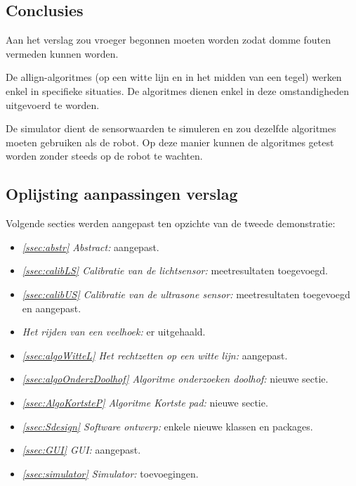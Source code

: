 \documentclass[tt3]{penoverslag}
\begin{document}
\subsection{Conclusies} %
\label{Assec:conc2}
Aan het verslag zou vroeger begonnen moeten worden zodat domme fouten vermeden kunnen worden.

De allign-algoritmes (op een witte lijn en in het midden van een tegel) werken enkel in specifieke situaties. De algoritmes dienen enkel in deze omstandigheden uitgevoerd te worden.

De simulator dient de sensorwaarden te simuleren en zou dezelfde algoritmes moeten gebruiken als de robot. Op deze manier kunnen de algoritmes getest worden zonder steeds op de robot te wachten.

\subsection{Oplijsting aanpassingen verslag} %
\label{Assec:aanp2}
Volgende secties werden aangepast ten opzichte van de tweede demonstratie:

\begin{itemize}
\item \textit{\ref{ssec:abstr} Abstract:} aangepast.
\item \textit{\ref{ssec:calibLS} Calibratie van de lichtsensor:} meetresultaten toegevoegd.
\item \textit{\ref{ssec:calibUS} Calibratie van de ultrasone sensor:} meetresultaten toegevoegd en aangepast.
\item \textit{ Het rijden van een veelhoek:} er uitgehaald.
\item \textit{\ref{ssec:algoWitteL} Het rechtzetten op een witte lijn:} aangepast.
\item \textit{\ref{ssec:algoOnderzDoolhof} Algoritme onderzoeken doolhof:} nieuwe sectie.
\item \textit{\ref{ssec:AlgoKortsteP} Algoritme Kortste pad:} nieuwe sectie.
\item \textit{\ref{ssec:Sdesign} Software ontwerp:} enkele nieuwe klassen en packages.
\item \textit{\ref{ssec:GUI} GUI:} aangepast.
\item \textit{\ref{ssec:simulator} Simulator:} toevoegingen.
\end{itemize}

\newpage
\end{document}
